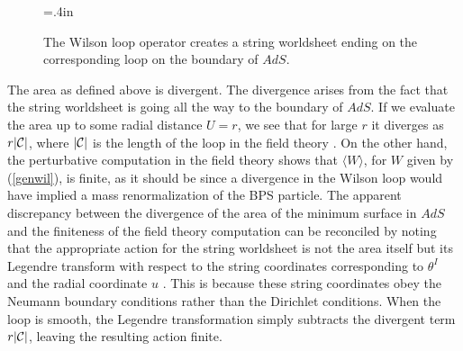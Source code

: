 \begin{figure}[htb]
\begin{center}
\epsfxsize=.4in\leavevmode{}
\end{center}
\caption{
The Wilson loop operator creates a string worldsheet ending 
on the corresponding loop on the boundary of $AdS$.
}
\label{wi2}
\end{figure} 

The area as defined above is divergent. The divergence arises
from the fact that the string worldsheet is going all the way 
to the boundary of $AdS$. If we evaluate the area up to some 
radial distance $U=r$, we see that for large $r$ it diverges as
$ r  | {\cal C} |$, where $|{\cal C}|$ is the length
of the loop in the field theory \cite{Maldacena:1998im,Rey:1998ik}.
On the other hand, the perturbative computation in the field theory
shows that $\langle W \rangle$, for $W$ given by (\ref{genwil}), is
finite, as it should be since a divergence in the Wilson loop would
have implied a mass renormalization of the BPS particle.  The apparent 
discrepancy between the divergence of the area of the minimum surface 
in $AdS$ and the finiteness of the field theory computation can be 
reconciled by noting 
that the appropriate action for the string worldsheet 
is not the area itself but its Legendre transform with respect to
the string coordinates corresponding to $\theta^I$ 
and the radial coordinate $u$ \cite{Drukker:1999zq}. 
This is because these string coordinates obey
the Neumann boundary conditions rather than the Dirichlet conditions. 
When the loop is smooth, the Legendre
transformation simply subtracts the 
divergent term $r |{\cal C}|$, leaving the resulting action
finite. 


